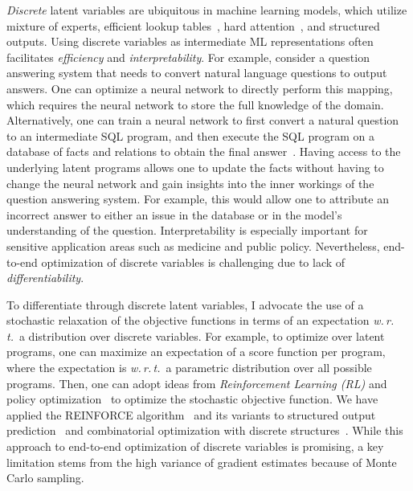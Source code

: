 \documentclass[a4paper, 10pt]{article}
\begin{document}
\hspace{\parindent} {\em Discrete} latent variables are ubiquitous in
machine learning models, which utilize mixture of experts, efficient
lookup tables~\cite{mih}, hard attention~\cite{hardattention}, and
structured outputs. Using discrete variables as intermediate ML
representations often facilitates {\em efficiency} and {\em
  interpretability}. For example, consider a question answering system
that needs to convert natural language questions to output
answers. One can optimize a neural network to directly perform this
mapping, which requires the neural network to store the full knowledge
of the domain. Alternatively, one can train a neural network to first
convert a natural question to an intermediate SQL program, and then
execute the SQL program on a database of facts and relations to obtain
the final answer~\cite{mapo}. Having access to the underlying latent
programs allows one to update the facts without having to change the
neural network and gain insights into the inner workings of the
question answering system. For example, this would allow one to
attribute an incorrect answer to either an issue in the database or in
the model's understanding of the question. Interpretability is
especially important for sensitive application areas such as medicine
and public policy. Nevertheless, end-to-end optimization of discrete
variables is challenging due to lack of {\em differentiability}.

To differentiate through discrete latent variables, I advocate the use
of a stochastic relaxation of the objective functions in terms of an
expectation {\em w.\,r.\,t.}~a distribution over discrete
variables. For example, to optimize over latent programs, one can
maximize an expectation of a score function per program, where the
expectation is {\em w.\,r.\,t.}~a parametric distribution over all
possible programs.  Then, one can adopt ideas from {\em Reinforcement
Learning (RL)} and policy optimization~\cite{sutton1998reinforcement}
to optimize the stochastic objective function. We have applied the
REINFORCE algorithm~\cite{reinforce} and its variants to structured
output prediction~\cite{wu2016gnmt} and combinatorial optimization
with discrete structures~\cite{bello2016neural,azalia2017}. While this
approach to end-to-end optimization of discrete variables is
promising, a key limitation stems from the high variance of gradient
estimates because of Monte Carlo sampling.
\end{document}
